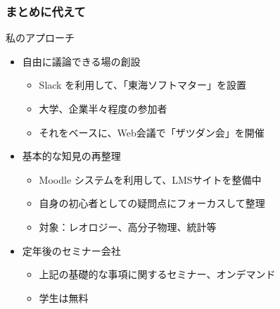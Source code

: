 \documentclass[unicode,12pt]{beamer}%
\begin{document}
\begin{frame}
    \frametitle{まとめに代えて}
        \begin{exampleblock}{私のアプローチ}
            \begin{itemize}
                \item 自由に議論できる場の創設
                \begin{itemize}
                    \item Slack を利用して、「東海ソフトマター」を設置
                    \item 大学、企業半々程度の参加者
                    \item それをベースに、Web会議で「ザツダン会」を開催
                \end{itemize}
                \item 基本的な知見の再整理
                \begin{itemize}
                    \item Moodle システムを利用して、LMSサイトを整備中
                    \item 自身の初心者としての疑問点にフォーカスして整理
                    \item 対象：レオロジー、高分子物理、統計等
                \end{itemize}
                \item 定年後のセミナー会社
                \begin{itemize}
                    \item 上記の基礎的な事項に関するセミナー、オンデマンド
                    \item 学生は無料
                \end{itemize}
            \end{itemize}
        \end{exampleblock}
\end{frame}
\end{document}
